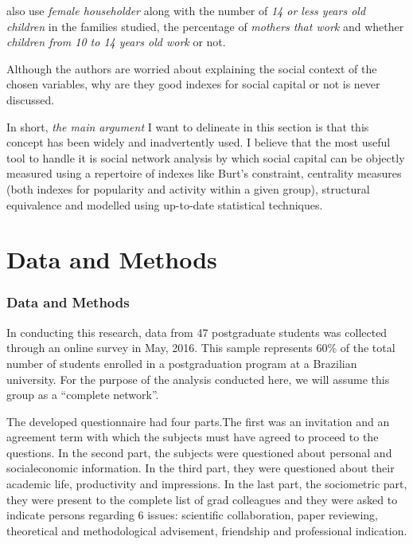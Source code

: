 \documentclass[compress]{beamer}
\begin{document}
\begin{frame}
	\justify
	
	 also use \textit{female householder} along with the number of \textit{14 or less years old children} in the families studied, the percentage of \textit{mothers that work} and whether \textit{children from 10 to 14 years old work} or not.
	
	\vspace{3mm}
	
	\begin{alertblock}{Although}
		the authors are worried about explaining the social context of the chosen variables, why are they good indexes for social capital or not is never discussed.
	\end{alertblock}
	
	In short, \textit{the main argument} I want to delineate in this section is that this concept has been widely and inadvertently used. I believe that the most useful tool to handle it is social network analysis by which social capital can be objectly measured using a repertoire of indexes like Burt's constraint, centrality measures (both indexes for popularity and activity within a given group), structural equivalence and modelled using up-to-date statistical techniques.
\end{frame}


\section{Data and Methods}
\begin{frame}
	\frametitle{Data and Methods}
	
	\justify
	
	In conducting this research, data from 47 postgraduate students was collected through an online survey in May, 2016. This sample represents 60\% of the total number of students enrolled in a postgraduation program at a Brazilian university. For the purpose of the analysis conducted here, we will assume this group as a ``complete network''.
	
	\vspace{3mm}
	
	The developed questionnaire had four parts.The first was an invitation and an agreement term with which the subjects must have agreed to proceed to the questions. In the second part, the subjects were questioned about personal and socialeconomic information. In the third part, they were questioned about their academic life, productivity and impressions. In the last part, the sociometric part, they were present to the complete list of grad colleagues and they were asked to indicate persons regarding 6 issues: scientific collaboration, paper reviewing, theoretical and methodological advisement, friendship and professional indication.
\end{frame}
\end{document}

